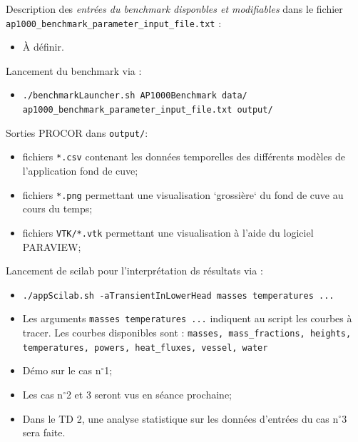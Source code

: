 \begin{frame}[fragile]
Description des \emph{entrées du benchmark disponbles et modifiables} dans le fichier \texttt{ap1000\_benchmark\_parameter\_input\_file.txt} :
\begin{itemize}
\item À définir.
\end{itemize}
\end{frame}
\begin{frame}[fragile]
Lancement du benchmark via :
\begin{itemize}
\item \texttt{./benchmarkLauncher.sh AP1000Benchmark data/ ap1000\_benchmark\_parameter\_input\_file.txt output/}
\end{itemize}
Sorties PROCOR dans \texttt{output/}:
\begin{itemize}
\item fichiers \texttt{*.csv} contenant les données temporelles des différents modèles de l'application fond de cuve;
\item fichiers \texttt{*.png} permettant une visualisation `grossière` du fond de cuve au cours du temps;
\item fichiers \texttt{VTK/*.vtk} permettant une visualisation à l'aide du logiciel PARAVIEW;
\end{itemize}
Lancement de scilab pour l'interprétation ds résultats via :
\begin{itemize}
\item \texttt{./appScilab.sh -aTransientInLowerHead masses temperatures ...}
\item Les arguments \texttt{masses temperatures ...} indiquent au script les courbes à tracer. Les courbes disponibles sont : \texttt{masses, mass\_fractions, heights, temperatures, powers, heat\_fluxes, vessel, water}
\end{itemize}
\end{frame}
\begin{frame}[fragile]
\begin{itemize}
\item Démo sur le cas n$^{\circ}$1;
\item Les cas n$^{\circ}$2 et 3 seront vus en séance prochaine;
\item Dans le TD 2, une analyse statistique sur les données d'entrées du cas n$^{\circ}$3 sera faite.
\end{itemize}
\end{frame}
